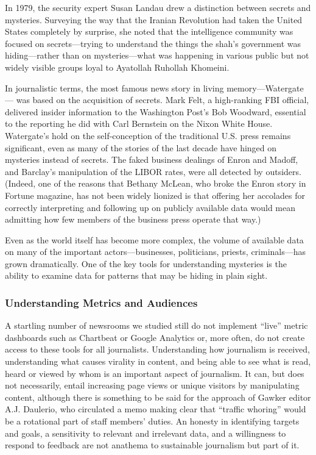In 1979, the security expert Susan Landau drew a distinction between secrets
and mysteries. Surveying the way that the Iranian Revolution had taken the
United States completely by surprise, she noted that the intelligence community
was focused on secrets—trying to understand the things the shah’s government
was hiding—rather than on mysteries—what was happening in various
public but not widely visible groups loyal to Ayatollah Ruhollah Khomeini.

In journalistic terms, the most famous news story in living memory—Watergate—
was based on the acquisition of secrets. Mark Felt, a high-ranking FBI
official, delivered insider information to the Washington Post’s Bob Woodward,
essential to the reporting he did with Carl Bernstein on the Nixon White House.
Watergate’s hold on the self-conception of the traditional U.S. press remains significant, even as many of the stories of the last decade have hinged on mysteries
instead of secrets. The faked business dealings of Enron and Madoff, and Barclay’s
manipulation of the LIBOR rates, were all detected by outsiders. (Indeed, one
of the reasons that Bethany McLean, who broke the Enron story in Fortune
magazine, has not been widely lionized is that offering her accolades for correctly
interpreting and following up on publicly available data would mean admitting
how few members of the business press operate that way.)

Even as the world itself has become more complex, the volume of available data
on many of the important actors—businesses, politicians, priests, criminals—has
grown dramatically. One of the key tools for understanding mysteries is the ability
to examine data for patterns that may be hiding in plain sight.

\subsubsection{Understanding Metrics and Audiences}

A startling number of newsrooms we studied still do not implement ``live'' metric
dashboards such as Chartbeat or Google Analytics or, more often, do not create
access to these tools for all journalists. Understanding how journalism is received,
understanding what causes virality in content, and being able to see what is read,
heard or viewed by whom is an important aspect of journalism. It can, but does
not necessarily, entail increasing page views or unique visitors by manipulating
content, although there is something to be said for the approach of Gawker editor
A.J. Daulerio, who circulated a memo making clear that ``traffic whoring''
would be a rotational part of staff members’ duties. An honesty in identifying
targets and goals, a sensitivity to relevant and irrelevant data, and a willingness
to respond to feedback are not anathema to sustainable journalism but part of it.

